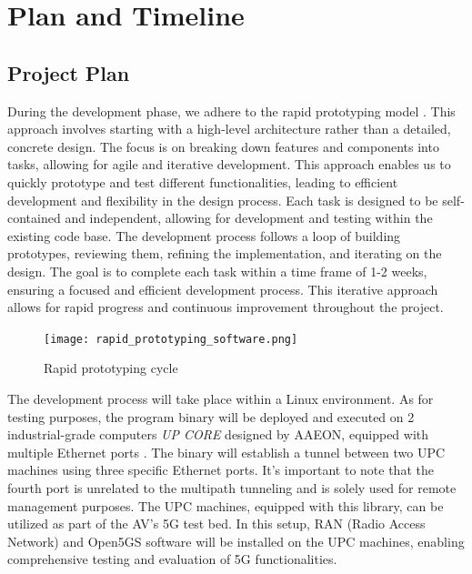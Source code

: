 \chapter{Plan and Timeline}\minitoc\label{sec:plan}\vspace{.5cm}

\section{Project Plan}

During the development phase, we adhere to the rapid prototyping model . 
This approach involves starting with a high-level architecture rather than a detailed, concrete design. 
The focus is on breaking down features and components into tasks, allowing for agile and iterative development. 
This approach enables us to quickly prototype and test different functionalities, leading to efficient development and flexibility in the design process.
Each task is designed to be self-contained and independent, allowing for development and testing within the existing code base. 
The development process follows a loop of building prototypes, reviewing them, refining the implementation, and iterating on the design. 
The goal is to complete each task within a time frame of 1-2 weeks, ensuring a focused and efficient development process. This iterative approach allows for rapid progress and continuous improvement throughout the project.

\begin{figure}[H]
	\centering
	\texttt{[image: rapid\_prototyping\_software.png]}
	\caption{Rapid prototyping cycle \cite{marketsplash_rapid_2021}}
	\label{fig:plan:rapid_prototyping_software}
\end{figure}

The development process will take place within a Linux environment. 
As for testing purposes, the program binary will be deployed and executed on 2 industrial-grade computers \textit{UP CORE} designed by \ac{AAEON}, equipped with multiple Ethernet ports \cite{upc_core} \cite{upc_extension_board}. 
The binary will establish a tunnel between two UPC machines using three specific Ethernet ports. 
It's important to note that the fourth port is unrelated to the multipath tunneling and is solely used for remote management purposes.
The UPC machines, equipped with this library, can be utilized as part of the AV's 5G test bed. 
In this setup, RAN (Radio Access Network) and Open5GS software will be installed on the UPC machines, enabling comprehensive testing and evaluation of 5G functionalities.

